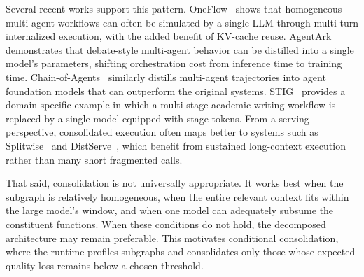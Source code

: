 Several recent works support this pattern. OneFlow~\citep{xu2026oneflow} shows that homogeneous multi-agent workflows can often be simulated by a single LLM through multi-turn internalized execution, with the added benefit of KV-cache reuse. AgentArk~\citep{luo2026agentark} demonstrates that debate-style multi-agent behavior can be distilled into a single model’s parameters, shifting orchestration cost from inference time to training time. Chain-of-Agents~\citep{li2025chainofagents} similarly distills multi-agent trajectories into agent foundation models that can outperform the original systems. STIG~\citep{stig2025} provides a domain-specific example in which a multi-stage academic writing workflow is replaced by a single model equipped with stage tokens. From a serving perspective, consolidated execution often maps better to systems such as Splitwise~\citep{patel2024splitwise} and DistServe~\citep{zhong2024distserve}, which benefit from sustained long-context execution rather than many short fragmented calls.

That said, consolidation is not universally appropriate. It works best when the subgraph is relatively homogeneous, when the entire relevant context fits within the large model’s window, and when one model can adequately subsume the constituent functions. When these conditions do not hold, the decomposed architecture may remain preferable. This motivates conditional consolidation, where the runtime profiles subgraphs and consolidates only those whose expected quality loss remains below a chosen threshold.
